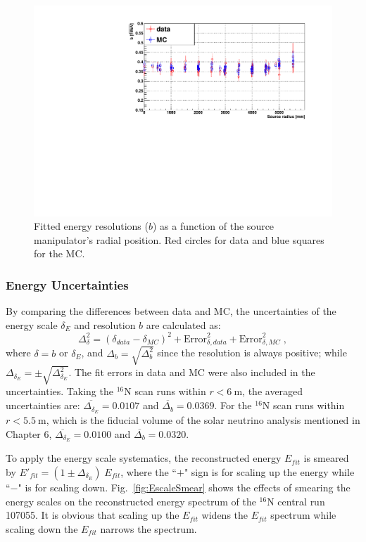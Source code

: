 \begin{figure}
	\centering
	\includegraphics[width=12cm]{EresolVsSrcRadius.pdf}
	\caption[Fitted energy resolutions ($b$) as a function of the source manipulator's radial position.]{Fitted energy resolutions ($b$) as a function of the source manipulator's radial position. Red circles for data and blue squares for the MC.	\label{fig:EresolVsR}}
\end{figure}

\subsubsection{Energy Uncertainties}\label{sect:eneryUncertianties}

By comparing the differences between data and MC, the uncertainties of the energy scale $\delta_E$ and resolution $b$ are calculated as:
\begin{equation}
\Delta^2_{\delta}= (\delta_{data}-\delta_{MC})^2+\mathrm{Error}^2_{\delta,data}+\mathrm{Error}^2_{\delta,MC}\; ,
\end{equation}
where $\delta=b$ or $\delta_E$, and $\Delta_b=\sqrt{\Delta^2_{b}}$ since the resolution is always positive; while $\Delta_{\delta_E}=\pm\sqrt{\Delta^2_{\delta_E}}$. The fit errors in data and MC were also included in the uncertainties. Taking the $^{16}$N scan runs within $r<6~$m, the averaged uncertainties are: $\overline{\Delta_{\delta_E}}=0.0107$ and $\overline{\Delta_{b}}=0.0369$. For the $^{16}$N scan runs within $r<5.5~\mathrm{m}$, which is the fiducial volume of the solar neutrino analysis mentioned in Chapter 6, $\overline{\Delta_{\delta_E}}=0.0100$ and $\overline{\Delta_{b}}=0.0320$.

To apply the energy scale systematics, the reconstructed energy $E_{fit}$ is smeared by $E'_{fit}=(1\pm\Delta_{\delta_E}) \; E_{fit}$, where the ``$+$" sign is for scaling up the energy while ``$-$" is for scaling down. Fig.~\ref{fig:EscaleSmear} shows the effects of smearing the energy scales on the reconstructed energy spectrum of the $^{16}$N central run 107055. It is obvious that scaling up the $E_{fit}$ widens the $E_{fit}$ spectrum while scaling down the $E_{fit}$ narrows the spectrum. 


